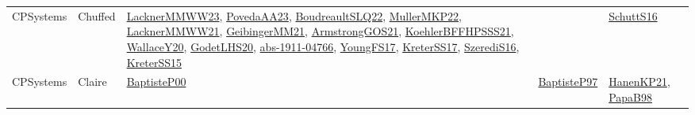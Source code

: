{\begin{longtable}{lp{3cm}>{\raggedright}p{6cm}>{\raggedright}p{6cm}p{8cm}}
CPSystems & Chuffed & \href{articles/LacknerMMWW23.pdf}{LacknerMMWW23}\cite{LacknerMMWW23}, \href{papers/PovedaAA23.pdf}{PovedaAA23}\cite{PovedaAA23}, \href{papers/BoudreaultSLQ22.pdf}{BoudreaultSLQ22}\cite{BoudreaultSLQ22}, \href{articles/MullerMKP22.pdf}{MullerMKP22}\cite{MullerMKP22}, \href{papers/LacknerMMWW21.pdf}{LacknerMMWW21}\cite{LacknerMMWW21}, \href{papers/GeibingerMM21.pdf}{GeibingerMM21}\cite{GeibingerMM21}, \href{papers/ArmstrongGOS21.pdf}{ArmstrongGOS21}\cite{ArmstrongGOS21}, \href{articles/KoehlerBFFHPSSS21.pdf}{KoehlerBFFHPSSS21}\cite{KoehlerBFFHPSSS21}, \href{articles/WallaceY20.pdf}{WallaceY20}\cite{WallaceY20}, \href{papers/GodetLHS20.pdf}{GodetLHS20}\cite{GodetLHS20}, \href{articles/abs-1911-04766.pdf}{abs-1911-04766}\cite{abs-1911-04766}, \href{papers/YoungFS17.pdf}{YoungFS17}\cite{YoungFS17}, \href{articles/KreterSS17.pdf}{KreterSS17}\cite{KreterSS17}, \href{papers/SzerediS16.pdf}{SzerediS16}\cite{SzerediS16}, \href{papers/KreterSS15.pdf}{KreterSS15}\cite{KreterSS15} &  & \href{papers/SchuttS16.pdf}{SchuttS16}\cite{SchuttS16}\\
CPSystems & Claire & \href{articles/BaptisteP00.pdf}{BaptisteP00}\cite{BaptisteP00} & \href{papers/BaptisteP97.pdf}{BaptisteP97}\cite{BaptisteP97} & \href{papers/HanenKP21.pdf}{HanenKP21}\cite{HanenKP21}, \href{articles/PapaB98.pdf}{PapaB98}\cite{PapaB98}\\

\end{longtable}}
